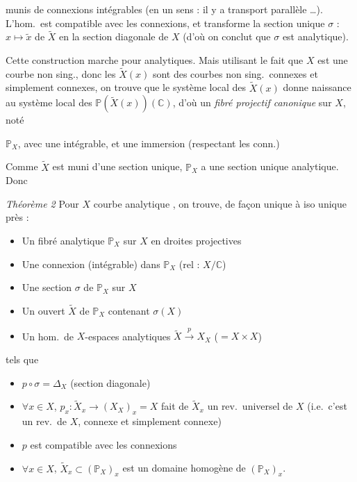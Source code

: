 \documentclass[11pt,a4paper]{article}
\begin{document}

munis de connexions intégrables (en un sens  : il y a transport parallèle …). L'hom.\ est compatible avec les connexions, et transforme la section unique $\sigma$ : $x \mapsto \tilde{x}$ de $\widetilde{X}$ en la section diagonale de $X$ (d'où on conclut que $\sigma$ est analytique).

Cette construction marche pour  \ill{} analytiques. Mais utilisant le fait que $X$ est une courbe non sing., donc les $\widetilde{X}(x)$ sont des courbes non sing.\ connexes et simplement connexes, on trouve que le système local des $\widetilde{X}(x)$ donne naissance au système local des $\mathbb{P}(\widetilde{X}(x))(\mathbb{C})$, d'où un \emph{fibré projectif canonique} sur $X$, noté

$\mathbb{P}_X$, avec une \struck{\ill{}}  intégrable, et une immersion  (respectant les conn.)


Comme $\widetilde{X}$ est muni d'une section unique, $\mathbb{P}_X$ a une section unique analytique. Donc

\emph{Théorème 2} Pour $X$ courbe analytique  , on trouve, de façon unique à iso unique près :
\begin{itemize}
\item[a)] Un fibré analytique $\mathbb{P}_X$ sur $X$ en droites projectives
\item[b)] Une connexion (intégrable) dans $\mathbb{P}_X$ (rel : $X/\mathbb{C}$)
\item[c)] Une section $\sigma$ de $\mathbb{P}_X$ sur $X$
\item[d)] Un ouvert $\widetilde{X}$ de $\mathbb{P}_X$ contenant $\sigma(X)$
\item[e)] Un hom.\ de $X$-espaces analytiques $\widetilde{X} \xrightarrow{\ p\ } X_X$ ($= X \times X$)
\end{itemize}
tels que
\begin{itemize}
\item[1°)] $p \circ \sigma = \Delta_X$ (section diagonale)
\item[2°)] $\forall x \in X$, $p_x : \widetilde{X}_x \longrightarrow (X_X)_x = X$ fait de $\widetilde{X}_x$ un rev.\ universel de $X$ (i.e.\ c'est un rev.\ de $X$,  connexe et simplement connexe)
\item[3°)] $p$ est compatible avec les connexions
\item[4°)] $\forall x \in X$, $\widetilde{X}_x \subset (\mathbb{P}_X)_x$ est un domaine homogène de $(\mathbb{P}_X)_x$.
\end{itemize}
\end{document}
